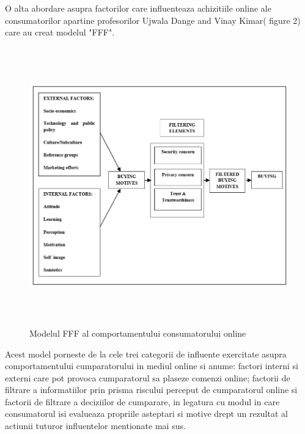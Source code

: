 \documentclass[a4paper, 12pt]{article}
\begin{document}
	\quad O alta abordare asupra factorilor care influenteaza achizitiile online ale consumatorilor apartine profesorilor Ujwala Dange and Vinay Kimar( figure 2) care au creat modelul "FFF".  
	\begin{figure}[!htb]
		\centering
		\includegraphics[width=15cm, height=12cm]{"figures/SECOND.png"}
		\caption{Modelul FFF al comportamentului consumatorului online}\label{fig:second}
	\end{figure}

	Acest model porneste de la cele trei categorii de influente exercitate asupra comportamentului cumparatorului in mediul online si anume: factori interni si externi care pot provoca cumparatorul sa plaseze comenzi online; factorii de filtrare a informatiilor prin prisma riscului perceput de cumparatorul online si factorii de filtrare a deciziilor de cumparare, in legatura cu modul in care consumatorul isi evalueaza propriile asteptari si motive drept un rezultat al actiunii tuturor influentelor mentionate mai sus.
	
\end{document}
